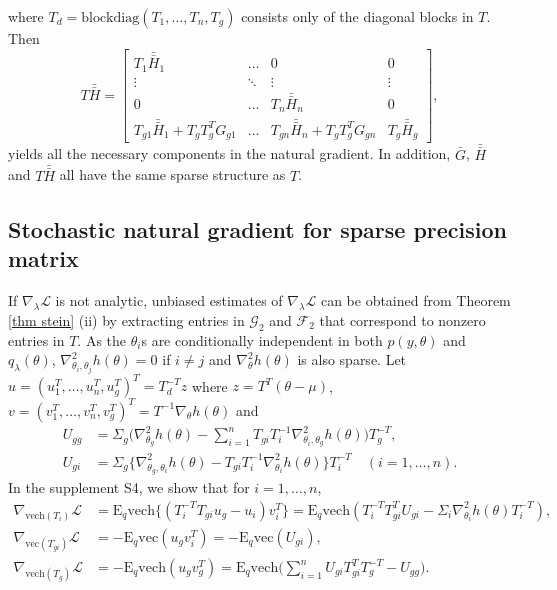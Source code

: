 \documentclass{statsoc}
\newcommand\E{{\text{E}}}
\newcommand\blockdiag{{\text{blockdiag}}}
\newcommand\mL{{\mathcal{L}}}
\newcommand\G{{\mathcal{G}}}
\newcommand\F{{\mathcal{F}}}
\newcommand{\vc}{\text{vec}}
\newcommand{\vech}{\text{vech}}
\newcommand{\dH}{\bar{\bar{H}}}
\begin{document}
where $T_d = \blockdiag(T_1, \dots, T_n, T_g)$ consists only of the diagonal blocks in $T$. Then 
\[
T\dH =  \begin{bmatrix}
T_1 \dH_1 &  \dots & 0 & 0 \\
\vdots & \ddots & \vdots & \vdots \\
0 & \dots  & T_n \dH_n & 0 \\
T_{g1}\dH_1 + T_g T_g^T G_{g1}  & \dots & T_{gn}\dH_n +  T_g T_g^T G_{gn}  & T_g \dH_g
\end{bmatrix},
\]
yields all the necessary components in the natural gradient. In addition, $\bar{G}$, $\dH$ and $T\dH$ all have the same sparse structure as $T$.



\subsection{Stochastic natural gradient for sparse precision matrix}
If $\nabla_\lambda \mL$ is not analytic, unbiased estimates of $\nabla_\lambda \mL$ can be obtained from Theorem \ref{thm stein} (ii) by extracting entries in $\G_2$ and $\F_2$ that correspond to nonzero entries in $T$. As the $\theta_i$s are conditionally independent in both $p(y, \theta)$ and $q_\lambda (\theta)$, $\nabla_{\theta_i, \theta_j}^2 h(\theta) = 0$ if $i \neq j$ and $\nabla_\theta^2 h(\theta)$ is also sparse. Let $u = (u_1^T, \dots, u_n^T, u_g^T)^T = T_d^{-T} z$ where $z =  T^T (\theta - \mu)$, $v = (v_1^T , \dots, v_n^T , v_g^T )^T = T^{-1} \nabla_\theta h(\theta)$ and 
\[
\begin{aligned}
U_{gg} &= \Sigma_g \bigg( \nabla_{\theta_g}^2 h(\theta) - \sum_{i=1}^n T_{gi} T_i^{-1} \nabla_{\theta_i, \theta_g}^2 h(\theta) \bigg) T_g^{-T}, \\
U_{gi} &= \Sigma_g \{\nabla_{\theta_g, \theta_i}^2 h(\theta) - T_{gi} T_i^{-1} \nabla_{\theta_i}^2 h(\theta)\}T_i^{-T} \quad (i=1, \dots, n).
\end{aligned}
\]
In the supplement S4, we show that for $i=1, \dots, n$, 
\[
\begin{aligned}
\nabla_{\vech(T_i)} \mL &= \E_q \vech \{ (T_i^{-T} T_{gi} u_g - u_i)  v_i^T\} 
= \E_q \vech (T_i^{-T} T_{gi}^T U_{gi} - \Sigma_i  \nabla_{\theta_i}^2 h(\theta)  T_i^{-T} ), \\
\nabla_{\vc(T_{gi})} \mL &= -\E_q \vc (u_g v_i^T)
= -\E_q \vc(U_{gi}), \\
\nabla_{\vech(T_g)} \mL &= -\E_q \vech(u_g v_g^T) = \E_q \vech \bigg(  \sum_{i=1}^n U_{gi}T_{gi}^TT_g^{-T} - U_{gg} \bigg) .
\end{aligned}
\]
\end{document}
